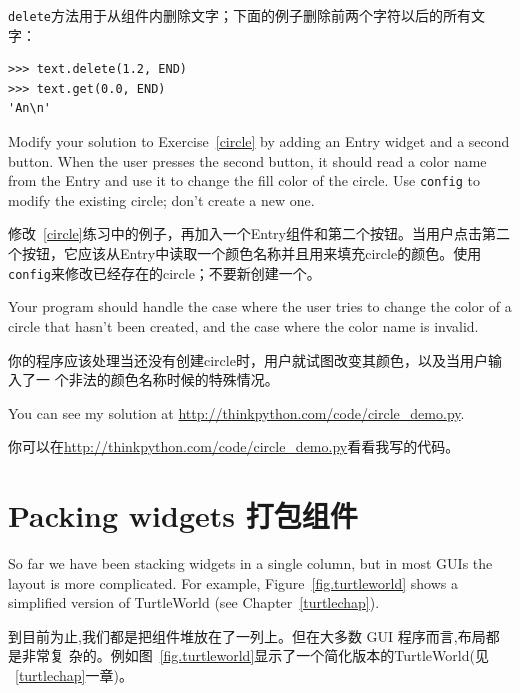 \documentclass[10pt]{book}
\begin{document}
\begin{CJK}{UTF8}{gbsn}
{\tt delete}方法用于从组件内删除文字；下面的例子删除前两个字符以后的所有文字：

\begin{verbatim}
>>> text.delete(1.2, END)
>>> text.get(0.0, END)
'An\n'
\end{verbatim}
%

\begin{exercise}
\label{circle2}

Modify your solution to Exercise~\ref{circle} by adding an
Entry widget and a second button.  When the user presses the
second button, it should read a color name from the Entry and
use it to change the fill color of the circle.  Use {\tt config}
to modify the existing circle; don't create a new one.

修改~\ref{circle}练习中的例子，再加入一个Entry组件和第二个按钮。当用户点击第二
个按钮，它应该从Entry中读取一个颜色名称并且用来填充circle的颜色。使用{\tt
config}来修改已经存在的circle；不要新创建一个。

Your program should handle the case where the user tries to
change the color of a circle that hasn't been created, and
the case where the color name is invalid.

你的程序应该处理当还没有创建circle时，用户就试图改变其颜色，以及当用户输入了一
个非法的颜色名称时候的特殊情况。

You can see my solution at \url{http://thinkpython.com/code/circle_demo.py}.

你可以在\url{http://thinkpython.com/code/circle_demo.py}看看我写的代码。


\end{exercise}


\section{Packing widgets 打包组件}

So far we have been stacking widgets in a single column, but in most
GUIs the layout is more complicated.  For example,
Figure~\ref{fig.turtleworld} shows a simplified version of
TurtleWorld (see Chapter~\ref{turtlechap}).

到目前为止,我们都是把组件堆放在了一列上。但在大多数 GUI 程序而言,布局都是非常复
杂的。例如图~\ref{fig.turtleworld}显示了一个简化版本的TurtleWorld(见
~\ref{turtlechap}一章)。


\end{CJK}
\end{document}

